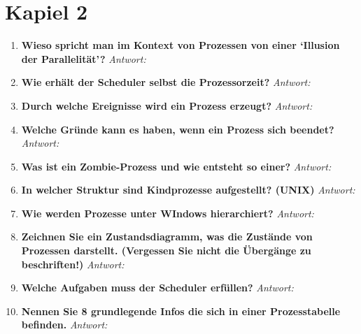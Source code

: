 \chapter{Kapiel 2}

\begin{enumerate}[label=\arabic*.]
      \item \textbf{Wieso spricht man im Kontext von Prozessen von einer `Illusion der Parallelität'?} \newline
            \textit{Antwort:}

      \item \textbf{Wie erhält der Scheduler selbst die Prozessorzeit?} \newline
            \textit{Antwort:}

      \item \textbf{Durch welche Ereignisse wird ein Prozess erzeugt?} \newline
            \textit{Antwort:}

      \item \textbf{Welche Gründe kann es haben, wenn ein Prozess sich beendet?} \newline
            \textit{Antwort:}

      \item \textbf{Was ist ein Zombie-Prozess und wie entsteht so einer?} \newline
            \textit{Antwort:}

      \item \textbf{In welcher Struktur sind Kindprozesse aufgestellt? (UNIX)} \newline
            \textit{Antwort:}

      \item \textbf{Wie werden Prozesse unter WIndows hierarchiert?} \newline
            \textit{Antwort:}

      \item \textbf{Zeichnen Sie ein Zustandsdiagramm, was die Zustände von Prozessen darstellt.
                  (Vergessen Sie nicht die Übergänge zu beschriften!)} \newline
            \textit{Antwort:}

      \item \textbf{Welche Aufgaben muss der Scheduler erfüllen?} \newline
            \textit{Antwort:}

      \item \textbf{Nennen Sie 8 grundlegende Infos die sich in einer Prozesstabelle befinden.} \newline
            \textit{Antwort:}


\end{enumerate}
